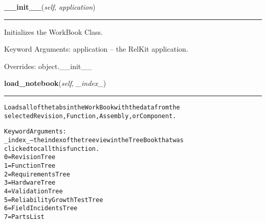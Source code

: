     \vspace{0.5ex}

\hspace{.8\funcindent}\begin{boxedminipage}{\funcwidth}

    \raggedright \textbf{\_\_init\_\_}(\textit{self}, \textit{application})

    \vspace{-1.5ex}

    \rule{\textwidth}{0.5\fboxrule}
\setlength{\parskip}{2ex}
    Initializes the WorkBook Class.

    Keyword Arguments: application -- the RelKit application.

\setlength{\parskip}{1ex}
      Overrides: object.\_\_init\_\_

    \end{boxedminipage}

    \label{reliafree:notebook:WorkBookWindow:load_notebook}

    \vspace{0.5ex}

\hspace{.8\funcindent}\begin{boxedminipage}{\funcwidth}

    \raggedright \textbf{load\_notebook}(\textit{self}, \textit{\_index\_})

    \vspace{-1.5ex}

    \rule{\textwidth}{0.5\fboxrule}
\setlength{\parskip}{2ex}
\begin{alltt}
Loads all of the tabs in the Work Book with the data from the
selected Revision, Function, Assembly, or Component.

Keyword Arguments:
\_index\_ -- the index of the treeview in the Tree Book that was
           clicked to call this function.
           0 = Revision Tree
           1 = Function Tree
           2 = Requirements Tree
           3 = Hardware Tree
           4 = Validation Tree
           5 = Reliability Growth Test Tree
           6 = Field Incidents Tree
           7 = Parts List
\end{alltt}

\setlength{\parskip}{1ex}
    \end{boxedminipage}

